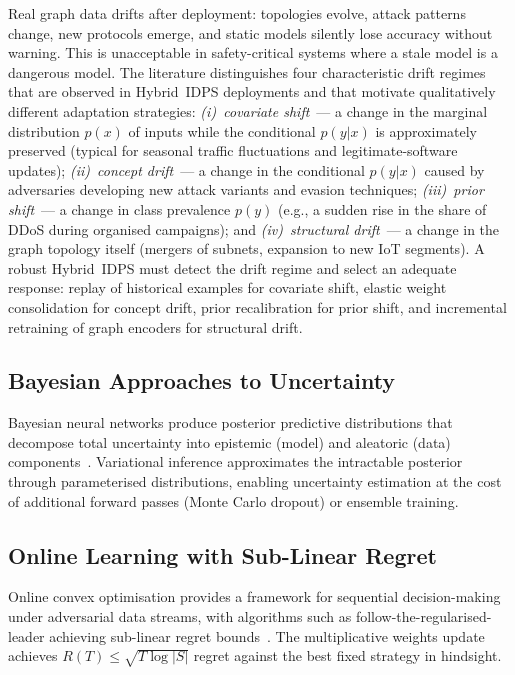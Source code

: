 Real graph data drifts after deployment: topologies evolve, attack patterns change, new protocols emerge, and static models silently lose accuracy without warning. This is unacceptable in safety-critical systems where a stale model is a dangerous model. The literature distinguishes four characteristic drift regimes that are observed in Hybrid~IDPS deployments and that motivate qualitatively different adaptation strategies: \emph{(i)~covariate shift}~--- a change in the marginal distribution $p(x)$ of inputs while the conditional $p(y|x)$ is approximately preserved (typical for seasonal traffic fluctuations and legitimate-software updates); \emph{(ii)~concept drift}~--- a change in the conditional $p(y|x)$ caused by adversaries developing new attack variants and evasion techniques; \emph{(iii)~prior shift}~--- a change in class prevalence $p(y)$ (e.g., a sudden rise in the share of DDoS during organised campaigns); and \emph{(iv)~structural drift}~--- a change in the graph topology itself (mergers of subnets, expansion to new IoT segments). A robust Hybrid~IDPS must detect the drift regime and select an adequate response: replay of historical examples for covariate shift, elastic weight consolidation for concept drift, prior recalibration for prior shift, and incremental retraining of graph encoders for structural drift.

\subsection{Bayesian Approaches to Uncertainty}

Bayesian neural networks produce posterior predictive distributions that decompose total uncertainty into epistemic (model) and aleatoric (data) components~\cite{Gal2016,Blundell2015,Lakshminarayanan2017,Kendall2017}. Variational inference approximates the intractable posterior through parameterised distributions, enabling uncertainty estimation at the cost of additional forward passes (Monte Carlo dropout) or ensemble training.

\subsection{Online Learning with Sub-Linear Regret}

Online convex optimisation provides a framework for sequential decision-making under adversarial data streams, with algorithms such as follow-the-regularised-leader achieving sub-linear regret bounds~\cite{Shalev2012,Arjovsky2017}. The multiplicative weights update achieves $R(T)\leq\sqrt{T\log|S|}$ regret against the best fixed strategy in hindsight.

